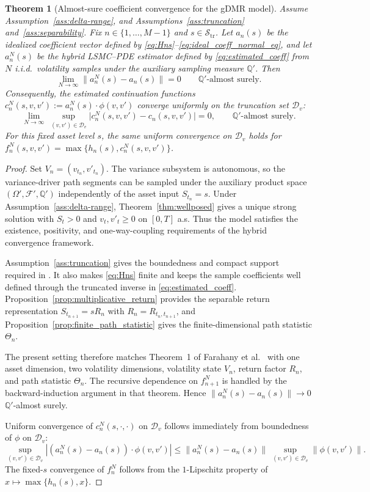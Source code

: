 \documentclass[10pt]{article}
\theoremstyle{plain}
\newtheorem{theorem}{Theorem}[section]
\theoremstyle{definition}
\theoremstyle{remark}
\begin{document}
\begin{theorem}[Almost-sure coefficient convergence for the gDMR model]
\label{thm:as_coeff_convergence}
Assume Assumption~\ref{ass:delta-range}, and Assumptions~\ref{ass:truncation}
and~\ref{ass:separability}. Fix $n\in\{1,\dots,M-1\}$ and $s\in\mathcal S_{\mathrm{tr}}$.
Let $a_n(s)$ be the idealized coefficient vector defined by \eqref{eq:Hns}--\eqref{eq:ideal_coeff_normal_eq}, and let
$a_n^N(s)$ be the hybrid LSMC--PDE estimator defined by \eqref{eq:estimated_coeff} from $N$ i.i.d.\ volatility samples
under the auxiliary sampling measure $\mathbb{Q}'$.
Then
\[
\lim_{N\to\infty} \bigl\|a_n^N(s)-a_n(s)\bigr\| = 0
\qquad \mathbb{Q}'\text{-almost surely}.
\]
Consequently, the estimated continuation functions
$c_n^N(s,v,v') := a_n^N(s)\cdot\phi(v,v')$ converge \emph{uniformly} on the truncation set $\mathcal{D}_v$:
\[
\lim_{N\to\infty}\ \sup_{(v,v')\in\mathcal{D}_v}
\bigl|c_n^N(s,v,v')-c_n(s,v,v')\bigr| = 0,
\qquad \mathbb{Q}'\text{-almost surely}.
\]
For this fixed asset level $s$, the same uniform convergence on $\mathcal D_v$ holds for
$f_n^N(s,v,v')=\max\{h_n(s),c_n^N(s,v,v')\}$.
\end{theorem}

\begin{proof}
Set $V_n=(v_{t_n},v'_{t_n})$. The variance subsystem is autonomous, so the variance-driver path segments can be
sampled under the auxiliary product space $(\Omega',\mathcal F',\mathbb Q')$ independently of the asset input
$S_{t_n}=s$. Under Assumption~\ref{ass:delta-range}, Theorem~\ref{thm:wellposed} gives a unique strong solution
with $S_t>0$ and $v_t,v'_t\ge0$ on $[0,T]$ a.s. Thus the model satisfies the existence, positivity, and
one-way-coupling requirements of the hybrid convergence framework.

Assumption~\ref{ass:truncation} gives the boundedness and compact support required in
\cite{farahany2020mixing}. It also makes \eqref{eq:Hns} finite and keeps the sample coefficients well defined
through the truncated inverse in \eqref{eq:estimated_coeff}. Proposition~\ref{prop:multiplicative_return}
provides the separable return representation $S_{t_{n+1}}=sR_n$ with $R_n=R_{t_n,t_{n+1}}$, and
Proposition~\ref{prop:finite_path_statistic} gives the finite-dimensional path statistic $\Theta_n$.

The present setting therefore matches Theorem~1 of Farahany et al.~\cite{farahany2020mixing} with one asset
dimension, two volatility dimensions, volatility state $V_n$, return factor $R_n$, and path statistic
$\Theta_n$. The recursive dependence on $f_{n+1}^N$ is handled by the backward-induction argument in that
theorem. Hence $\|a_n^N(s)-a_n(s)\|\to0$ $\mathbb Q'$-almost surely.

Uniform convergence of $c_n^N(s,\cdot,\cdot)$ on $\mathcal{D}_v$ follows immediately from boundedness of $\phi$ on $\mathcal{D}_v$:
\[
\sup_{(v,v')\in\mathcal{D}_v} |(a_n^N(s)-a_n(s))\cdot\phi(v,v')|
\le \|a_n^N(s)-a_n(s)\|\ \sup_{(v,v')\in\mathcal{D}_v}\|\phi(v,v')\|.
\]
The fixed-$s$ convergence of $f_n^N$ follows from the $1$-Lipschitz property of
$x\mapsto \max\{h_n(s),x\}$.
\end{proof}
\end{document}
